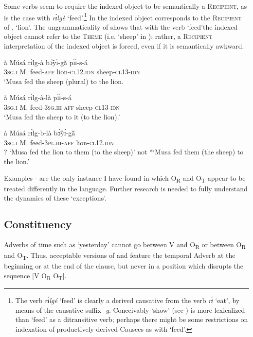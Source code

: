 \documentclass[output=paper]{langsci/langscibook}
\begin{document}
Some verbs seem to require the indexed object to be semantically a \textsc{Recipient}, as is the case with \textit{rɪ́lgè} `feed'.\footnote{ The verb \textit{rɪ́lgé} `feed' is clearly a derived causative from the verb \textit{rɪ́} `eat', by means of the causative suffix \textit{-g}. Conceivably `show' (see ) is more lexicalized than `feed' as a ditransitive verb; perhaps there might be some restrictions on indexation of productively-derived Causees as with `feed'.} In  the indexed object corresponds to the \textsc{Recipient} of , `lion'. The ungrammaticality of  shows that with the verb `feed'the indexed object cannot refer to the \textsc{Theme} (i.e. `sheep' in ); rather, a \textsc{Recipient} interpretation of the indexed object is forced, even if it is semantically awkward.

\ea
\label{ex:28.pacchiarotti}
\gll à    Músá  rɪ́lg-à    bɔ̃̀yɪ́-g\`{ã}    pɪ́ɪ́-s-á\\
\textsc{3sg.i}    M.  feed-\textsc{aff}  lion-\textsc{cl12.idn}  sheep-\textsc{cl13-idn}\\
\glt `Musa fed the sheep (plural) to the lion.
\z

\ea
\label{ex:29.pacchiarotti}
\gll à    Músá    rɪ́lg-à-là    pɪ́ɪ́-s-á\\
\textsc{3sg.i}    M.    feed-\textsc{3sg.iii-aff}  sheep-\textsc{cl13-idn}\\
\glt `Musa fed the sheep to it (to the lion).'
\z

\ea
\label{ex:30.pacchiarotti}
\gll à    Músá  rɪ́lg-b-là     bɔ̃̀yɪ́-g\`{ã} \\
\textsc{3sg.i}    M.  feed-\textsc{3pl.iii-aff}    lion-\textsc{cl12.idn}\\
\glt
? `Musa fed the lion to them (to the sheep)' not *`Musa fed them (the sheep) to the lion.'  
\z

Examples - are the only instance I have found in which O\textsubscript{R} and O\textsubscript{T} appear to be treated differently in the language. Further research is needed to fully understand the dynamics of these `exceptions'.

\subsection{Constituency}\label{§4.5:constituency.pacchiarotti}

Adverbs of time such as `yesterday' cannot go between V and O\textsubscript{R} or between O\textsubscript{R} and O\textsubscript{T}. Thus, acceptable versions of  and  feature the temporal Adverb at the beginning or at the end of the clause, but never in a position which disrupts the sequence [V O\textsubscript{R} O\textsubscript{T}].
\end{document}
